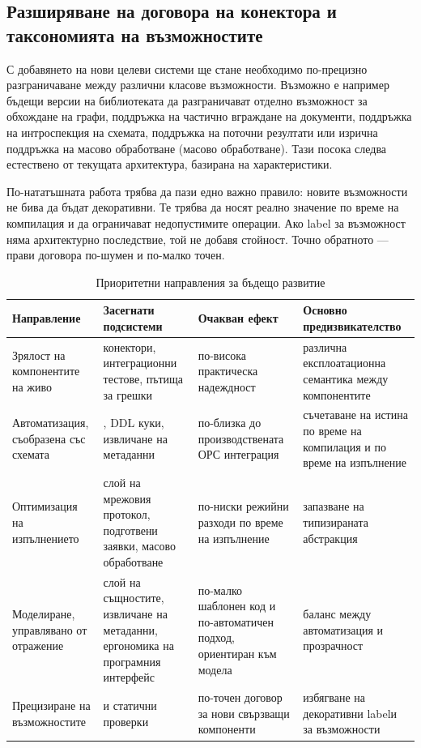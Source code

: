 \subsection{Разширяване на договора на конектора и таксономията на възможностите}

С добавянето на нови целеви системи ще стане необходимо по-прецизно разграничаване между различни класове възможности. Възможно е например бъдещи версии на библиотеката да разграничават отделно възможност за обхождане на графи, поддръжка на частично вграждане на документи, поддръжка на интроспекция на схемата, поддръжка на поточни резултати или изрична поддръжка на масово обработване (масово обработване). Тази посока следва естествено от текущата архитектура, базирана на характеристики.

По-нататъшната работа трябва да пази едно важно правило: новите възможности не бива да бъдат декоративни. Те трябва да носят реално значение по време на компилация и да ограничават недопустимите операции. Ако label за възможност няма архитектурно последствие, той не добавя стойност. Точно обратното --- прави договора по-шумен и по-малко точен.

\begin{table}[H]
\centering
\small
\caption{Приоритетни направления за бъдещо развитие}
\label{tab:future_work_priorities}
\begin{tabularx}{\textwidth}{L{3.0cm}L{3.2cm}L{3.1cm}Y}
\toprule
\textbf{Направление} & \textbf{Засегнати подсистеми} & \textbf{Очакван ефект} & \textbf{Основно предизвикателство} \\
\midrule
Зрялост на компонентите на живо & конектори, интеграционни тестове, пътища за грешки & по-висока практическа надеждност & различна експлоатационна семантика между компонентите \\
Автоматизация, съобразена със схемата & , DDL куки, извличане на метаданни & по-близка до производствената ОРС интеграция & съчетаване на истина по време на компилация и по време на изпълнение \\
Оптимизация на изпълнението & слой на мрежовия протокол, подготвени заявки, масово обработване & по-ниски режийни разходи по време на изпълнение & запазване на типизираната абстракция \\
Моделиране, управлявано от отражение & слой на същностите, извличане на метаданни, ергономика на програмния интерфейс & по-малко шаблонен код и по-автоматичен подход, ориентиран към модела & баланс между автоматизация и прозрачност \\
Прецизиране на възможностите &  и статични проверки & по-точен договор за нови свързващи компоненти & избягване на декоративни labelи за възможности \\
\bottomrule
\end{tabularx}
\end{table}

